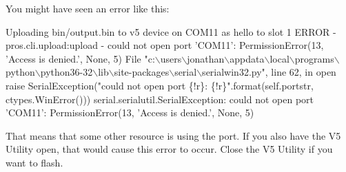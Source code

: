 You might have seen an error like this\+:


\begin{DoxyCode}
Uploading bin/output.bin to v5 device on COM11 as hello to slot 1
ERROR - pros.cli.upload:upload - could not open port 'COM11': PermissionError(13, 'Access is denied.',
       None, 5)
File "c:\(\backslash\)users\(\backslash\)jonathan\(\backslash\)appdata\(\backslash\)local\(\backslash\)programs\(\backslash\)python\(\backslash\)python36-32\(\backslash\)lib\(\backslash\)site-packages\(\backslash\)serial\(\backslash\)serialwin32.py",
       line 62, in open
  raise SerialException("could not open port \{!r\}: \{!r\}".format(self.portstr, ctypes.WinError()))
serial.serialutil.SerialException: could not open port 'COM11': PermissionError(13, 'Access is denied.',
       None, 5)
\end{DoxyCode}


That means that some other resource is using the port. If you also have the V5 Utility open, that would cause this error to occur. Close the V5 Utility if you want to flash. 